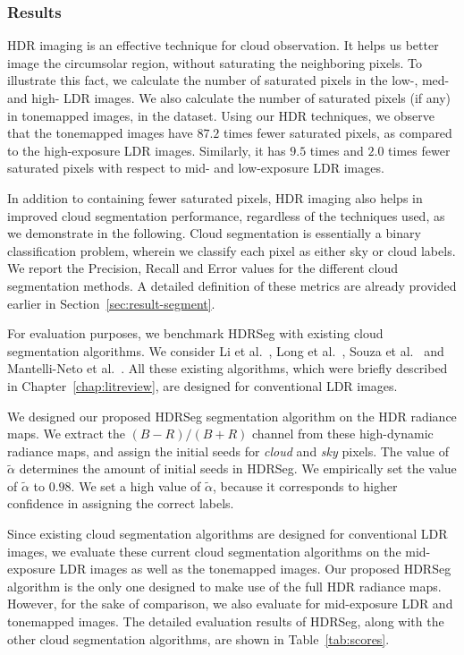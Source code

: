 \subsubsection{Results}
HDR imaging is an effective technique for cloud observation. It helps us better image the circumsolar region, without saturating the neighboring pixels. To illustrate this fact, we calculate the number of saturated pixels in the low-, med- and high- LDR images. We also calculate the number of saturated pixels (if any) in tonemapped images, in the dataset. Using our HDR techniques, we observe that the tonemapped images have $87.2$ times fewer saturated pixels, as compared to the high-exposure LDR images. Similarly, it has $9.5$ times and $2.0$ times fewer saturated pixels with respect to mid- and low-exposure LDR images.

In addition to containing fewer saturated pixels, HDR imaging also helps in improved cloud segmentation performance, regardless of the techniques used, as we demonstrate in the following. 
Cloud segmentation is essentially a binary classification problem, wherein we classify each pixel as either sky or cloud labels. We report the Precision, Recall and Error values for the different cloud segmentation methods. A detailed definition of these metrics are already provided earlier in Section~\ref{sec:result-segment}. 

For evaluation purposes, we benchmark HDRSeg with existing cloud segmentation algorithms. We consider Li et al.~\cite{Li2011}, Long et al.~\cite{Long}, Souza et al.~\cite{Souza} and Mantelli-Neto et al.~\cite{Sylvio}. All these existing algorithms, which were briefly described in Chapter~\ref{chap:litreview}, are designed for conventional LDR images.

We designed our proposed HDRSeg segmentation algorithm on the HDR radiance maps. We extract the $(B-R)/(B+R)$ channel from these high-dynamic radiance maps, and assign the initial seeds for \emph{cloud} and \emph{sky} pixels. The value of $\tilde{\alpha}$ determines the amount of initial seeds in HDRSeg. We empirically set the value of $\tilde{\alpha}$ to $0.98$. We set a high value of $\tilde{\alpha}$, because it corresponds to higher confidence in assigning the correct labels.

Since existing cloud segmentation algorithms are designed for conventional LDR images, we evaluate these current cloud segmentation algorithms on the mid-exposure LDR images as well as the tonemapped images. Our proposed HDRSeg algorithm is the only one designed to make use of the full HDR radiance maps. However, for the sake of comparison, we also evaluate for mid-exposure LDR and tonemapped images. The detailed evaluation results of HDRSeg, along with the other cloud segmentation algorithms, are shown in Table~\ref{tab:scores}.

